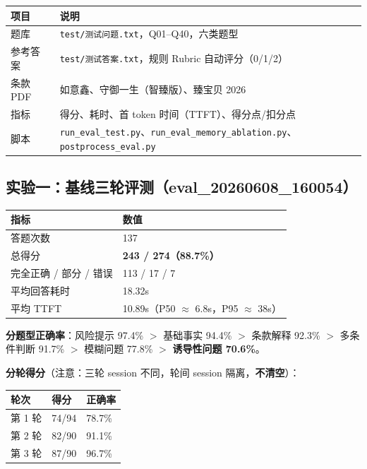 \documentclass[11pt,a4paper]{ctexart}
\begin{document}
\begin{center}
\begin{tabular}{ll}
\toprule
\textbf{项目} & \textbf{说明} \\
\midrule
题库 & \texttt{test/测试问题.txt}，Q01--Q40，六类题型 \\
参考答案 & \texttt{test/测试答案.txt}，规则 Rubric 自动评分（0/1/2） \\
条款 PDF & 如意鑫、守御一生（智臻版）、臻宝贝 2026 \\
指标 & 得分、耗时、首 token 时间（TTFT）、得分点/扣分点 \\
脚本 & \texttt{run\_eval\_test.py}、\texttt{run\_eval\_memory\_ablation.py}、\texttt{postprocess\_eval.py} \\
\bottomrule
\end{tabular}
\end{center}

\subsection{实验一：基线三轮评测（eval\_20260608\_160054）}

\begin{center}
\begin{tabular}{ll}
\toprule
\textbf{指标} & \textbf{数值} \\
\midrule
答题次数 & 137 \\
总得分 & \textbf{243 / 274（88.7\%）} \\
完全正确 / 部分 / 错误 & 113 / 17 / 7 \\
平均回答耗时 & 18.32s \\
平均 TTFT & 10.89s（P50 $\approx$ 6.8s，P95 $\approx$ 38s） \\
\bottomrule
\end{tabular}
\end{center}

\textbf{分题型正确率}：风险提示 97.4\% $>$ 基础事实 94.4\% $>$ 条款解释 92.3\% $>$ 多条件判断 91.7\% $>$ 模糊问题 77.8\% $>$ \textbf{诱导性问题 70.6\%}。

\textbf{分轮得分}（注意：三轮 session 不同，轮间 session 隔离，\textbf{不清空}）：

\begin{center}
\begin{tabular}{lll}
\toprule
\textbf{轮次} & \textbf{得分} & \textbf{正确率} \\
\midrule
第 1 轮 & 74/94 & 78.7\% \\
第 2 轮 & 82/90 & 91.1\% \\
第 3 轮 & 87/90 & 96.7\% \\
\bottomrule
\end{tabular}
\end{center}
\end{document}
